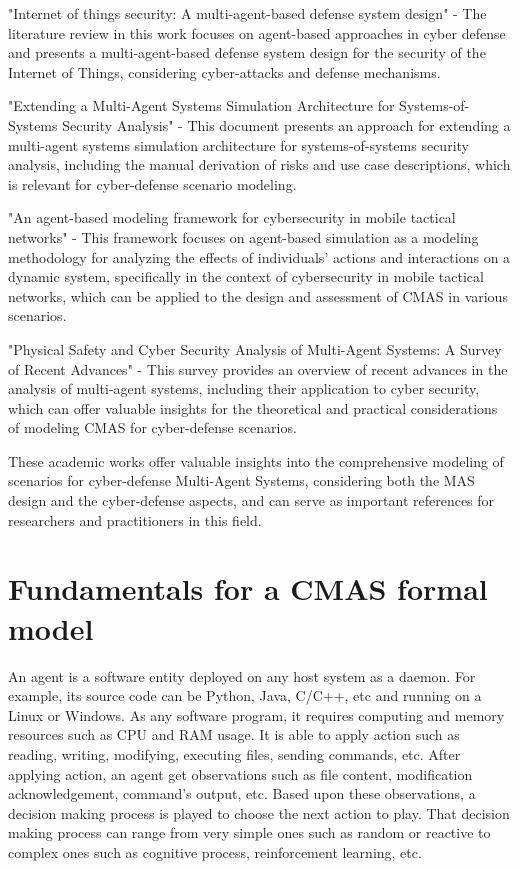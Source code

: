 \documentclass[conference]{IEEEtran}
\begin{document}
"Internet of things security: A multi-agent-based defense system design" - The literature review in this work focuses on agent-based approaches in cyber defense and presents a multi-agent-based defense system design for the security of the Internet of Things, considering cyber-attacks and defense mechanisms\cite{aydin2023}.

"Extending a Multi-Agent Systems Simulation Architecture for Systems-of-Systems Security Analysis" - This document presents an approach for extending a multi-agent systems simulation architecture for systems-of-systems security analysis, including the manual derivation of risks and use case descriptions, which is relevant for cyber-defense scenario modeling\cite{elhachem2018}.

"An agent-based modeling framework for cybersecurity in mobile tactical networks" - This framework focuses on agent-based simulation as a modeling methodology for analyzing the effects of individuals' actions and interactions on a dynamic system, specifically in the context of cybersecurity in mobile tactical networks, which can be applied to the design and assessment of CMAS in various scenarios\cite{thompson2018}.

"Physical Safety and Cyber Security Analysis of Multi-Agent Systems: A Survey of Recent Advances" - This survey provides an overview of recent advances in the analysis of multi-agent systems, including their application to cyber security, which can offer valuable insights for the theoretical and practical considerations of modeling CMAS for cyber-defense scenarios\cite{dan2021}.

These academic works offer valuable insights into the comprehensive modeling of scenarios for cyber-defense Multi-Agent Systems, considering both the MAS design and the cyber-defense aspects, and can serve as important references for researchers and practitioners in this field.




\section{Fundamentals for a CMAS formal model}

An agent is a software entity deployed on any host system as a daemon.
For example, its source code can be Python, Java, C/C++, etc and running on a Linux or Windows.
As any software program, it requires computing and memory resources such as CPU and RAM usage.
It is able to apply action such as reading, writing, modifying, executing files, sending commands, etc.
After applying action, an agent get observations such as file content, modification acknowledgement, command's output, etc.
Based upon these observations, a decision making process is played to choose the next action to play. That decision making process can range from very simple ones such as random or reactive to complex ones such as cognitive process, reinforcement learning, etc.
\end{document}
